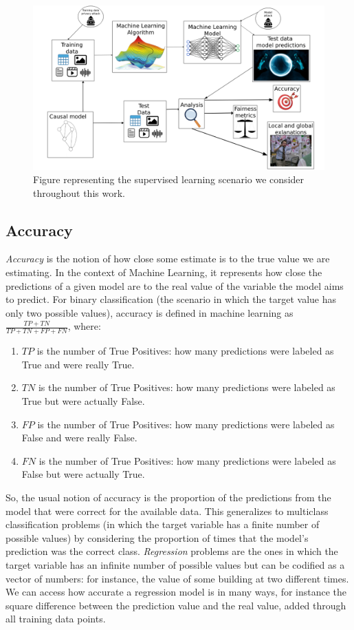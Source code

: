\begin{figure}[ht]
\centering
\includegraphics[width=\textwidth]{EverythingEAAO}
\caption{Figure representing the supervised learning scenario we consider throughout this work.}\label{fig:EEAAO}
\end{figure}

\subsection{Accuracy}

\emph{Accuracy} is the notion of how close some estimate is to the true value we are estimating. In the context of Machine Learning, it represents how close the predictions of a given model are to the real value of the variable the model aims to predict. For binary classification (the scenario in which the target value has only two possible values), accuracy is defined in machine learning as $\frac{TP+TN}{TP+TN+FP+FN}$, where:

\begin{enumerate}
\item $TP$ is the number of True Positives: how many predictions were labeled as True and were really True.
\item $TN$ is the number of True Positives: how many predictions were labeled as True but were actually False.
\item $FP$ is the number of True Positives: how many predictions were labeled as False and were really False.
\item $FN$ is the number of True Positives: how many predictions were labeled as False but were actually True.
\end{enumerate}

So, the usual notion of accuracy is the proportion of the predictions from the model that were correct for the available data. This generalizes to multiclass classification problems (in which the target variable has a finite number of possible values) by considering the proportion of times that the model's prediction was the correct class. \emph{Regression} problems are the ones in which the target variable has an infinite number of possible values but can be codified as a vector of numbers: for instance, the value of some building at two different times. We can access how accurate a regression model is in many ways, for instance the square difference between the prediction value and the real value, added through all training data points.

